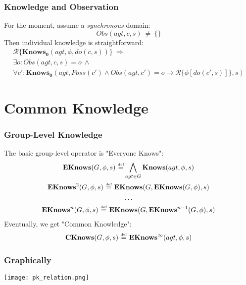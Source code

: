\documentclass{beamer}
\newcommand{\isdef}{\hbox{$\stackrel{\mbox{\tiny def}}{=}$}}
\begin{document}
\begin{frame}
\frametitle{Knowledge and Observation}

For the moment, assume a \emph{synchronous} domain:
\begin{equation*}
Obs(agt,c,s)\ \neq\ \{\}
\end{equation*}
Then individual knowledge is straightforward:
\begin{multline*}
\mathcal{R}\{\mathbf{Knows_0}(agt,\phi,do(c,s))\}\ \Rightarrow \\
\exists o: Obs(agt,c,s)=o\ \wedge\\
\forall c': \mathbf{Knows_0}(agt,Poss(c') \wedge Obs(agt,c')=o \rightarrow \mathcal{R}\{\phi[do(c',s)]\},s)
\end{multline*}
\end{frame}

\section{Common Knowledge}
\begin{frame}
\frametitle{Group-Level Knowledge}
The basic group-level operator is "Everyone Knows":
\begin{gather*}
\mathbf{EKnows}(G,\phi,s)\ \isdef \bigwedge_{agt \in G} \mathbf{Knows}(agt,\phi,s)\\
\mathbf{EKnows}^{2}(G,\phi,s)\ \isdef\ \mathbf{EKnows}(G,\mathbf{EKnows}(G,\phi),s)\\
\dots \\
\mathbf{EKnows}^{n}(G,\phi,s)\ \isdef\ \mathbf{EKnows}(G,\mathbf{EKnows}^{n-1}(G,\phi),s)
\end{gather*}
Eventually, we get "Common Knowledge":
\begin{gather*}
\mathbf{CKnows}(G,\phi,s)\ \isdef\ \mathbf{EKnows}^{\infty}(agt,\phi,s)
\end{gather*}
\end{frame}

\begin{frame}
\frametitle{Graphically}
\begin{center}
  \texttt{[image: pk\_relation.png]}
\end{center}
\end{frame}
\end{document}
